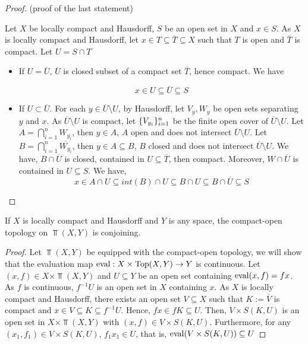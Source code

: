 \documentclass{article}
\begin{document}
\begin{proof}
    (proof of the last statement)

    Let $X$ be locally compact and Hausdorff, $S$ be an open set in $X$ and $x \in S$. As $X$ is locally compact and Hausdorff, let $x \in T \subseteq \overline{T} \subseteq X$ such that $T$ is open and $\overline{T}$ is compact. Let $U = S \cap T$
    \begin{itemize}
        \item If $U = \overline{U}$, $\overline{U}$ is closed subset of a compact set $\overline{T}$, hence compact. We have

        $$
            x \in U \subseteq \overline{U} \subseteq S
        $$

        \item If $U \subset \overline{U}$. For each $y \in \overline{U} \setminus U$, by Hausdorff, let $V_y, W_y$ be open sets separating $y$ and $x$. As $\overline{U} \setminus U$ is compact, let $\{V_{y_i}\}_{i=1}^n$ be the finite open cover of $\overline{U} \setminus U$. Let $A = \bigcap_{i=1}^n W_{y_i}$, then $y \in A$, $A$ open and does not intersect $\overline{U} \setminus U$. Let $B = \bigcap_{i=1}^n \overline{W_{y_i}}$, then $y \in A \subseteq B$, $B$ closed and does not intersect $\overline{U} \setminus U$.  We have, $B \cap \overline{U}$ is closed, contained in $U \subseteq \overline{T}$, then compact. Moreover, $W \cap \overline{U}$ is contained in $U \subseteq S$. We have, 
        $$
            x \in A \cap U \subseteq int(B) \cap U \subseteq B \cap U \subseteq B \cap \overline{U} \subseteq S
        $$
    \end{itemize}
\end{proof}

\begin{theorem}
    If $X$ is locally compact and Hausdorff and $Y$ is any space, the compact-open topology on $\Top(X, Y)$ is conjoining.
\end{theorem}

\begin{proof}
    Let $\Top(X, Y)$ be equipped with the compact-open topology, we will show that the evaluation map $\operatorname{eval}: X \times \operatorname{Top}(X, Y) \to Y$ is continuous. Let $(x, f) \in X \times \Top(X, Y)$ and $U \subseteq Y$ be an open set containing $\operatorname{eval}(x, f) = fx$. As $f$ is continuous, $f^{-1} U$ is an open set in $X$ containing $x$. As $X$ is locally compact and Hausdorff, there exists an open set $V \subseteq X$ such that $K := \overline{V}$ is compact and $x \in V \subseteq K \subseteq f^{-1} U$. Hence, $fx \in fK \subseteq U$. Then, $V \times S(K, U)$ is an open set in $X \times \Top(X, Y)$ with $(x, f) \in V \times S(K, U)$. Furthermore, for any $(x_1, f_1) \in V \times S(K, U)$, $f_1 x_1 \in U$, that is, $\operatorname{eval}(V \times S(K, U)) \subseteq U$
\end{proof}
\end{document}
